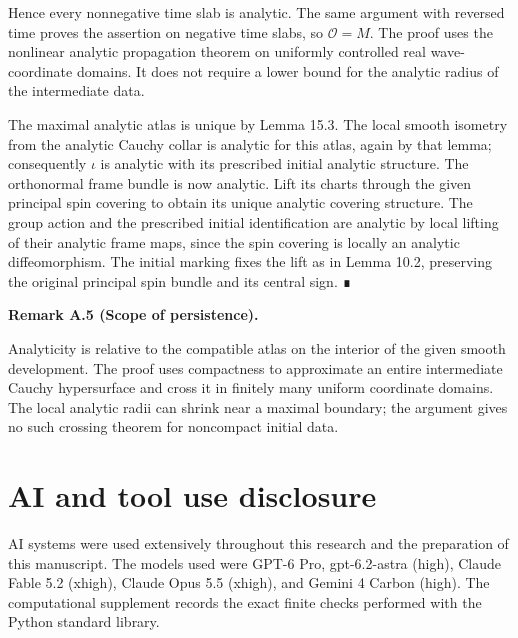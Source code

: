 \documentclass[
  english,
  11pt,
  reqno]{amsart}
\makeatletter
\newcommand{\pandocstatementheading}[1]{%
  \par\addpenalty{\@beginparpenalty}%
  \addvspace{.5\baselineskip plus .2\baselineskip minus .2\baselineskip}%
  {\normalfont\bfseries #1\par}%
  \nobreak\@afterindenttrue\@afterheading
}
\makeatother
\begin{document}
Hence every nonnegative time slab is analytic. The same argument with
reversed time proves the assertion on negative time slabs, so
\(\mathcal O=M\). The proof uses the nonlinear analytic propagation
theorem on uniformly controlled real wave-coordinate domains. It does
not require a lower bound for the analytic radius of the intermediate
data.

The maximal analytic atlas is unique by Lemma 15.3. The local smooth
isometry from the analytic Cauchy collar is analytic for this atlas,
again by that lemma; consequently \(\iota\) is analytic with its
prescribed initial analytic structure. The orthonormal frame bundle is
now analytic. Lift its charts through the given principal spin covering
to obtain its unique analytic covering structure. The group action and
the prescribed initial identification are analytic by local lifting of
their analytic frame maps, since the spin covering is locally an
analytic diffeomorphism. The initial marking fixes the lift as in Lemma
10.2, preserving the original principal spin bundle and its central
sign. ∎

\pandocstatementheading{\protect{}\label{rem:compact-analytic-persistence-scope}Remark A.5 (Scope of persistence).}

Analyticity is relative to the compatible atlas on the interior of the
given smooth development. The proof uses compactness to approximate an
entire intermediate Cauchy hypersurface and cross it in finitely many
uniform coordinate domains. The local analytic radii can shrink near a
maximal boundary; the argument gives no such crossing theorem for
noncompact initial data.

\protect{}\label{sec:ai-and-tool-use-disclosure}

\section{AI and tool use disclosure}\label{ai-and-tool-use-disclosure}

AI systems were used extensively throughout this research and the
preparation of this manuscript. The models used were GPT-6 Pro,
gpt-6.2-astra (high), Claude Fable 5.2 (xhigh), Claude Opus 5.5 (xhigh),
and Gemini 4 Carbon (high). The computational supplement records the
exact finite checks performed with the Python standard library.

\protect{}\label{sec:references}
\end{document}
